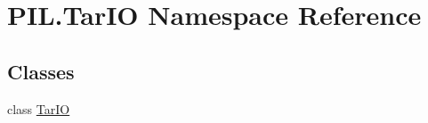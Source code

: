 \hypertarget{namespacePIL_1_1TarIO}{}\section{P\+I\+L.\+Tar\+IO Namespace Reference}
\label{namespacePIL_1_1TarIO}
\subsection*{Classes}
\begin{DoxyCompactItemize}
\item 
class \hyperlink{classPIL_1_1TarIO_1_1TarIO}{Tar\+IO}
\end{DoxyCompactItemize}
